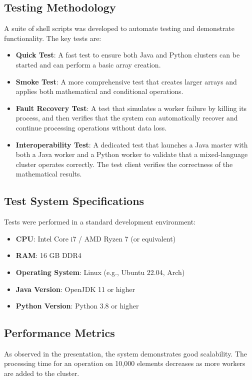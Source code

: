 \documentclass[10pt,a4paper]{article}
\theoremstyle{definition}
\theoremstyle{remark}
\begin{document}
\subsection{Testing Methodology}
A suite of shell scripts was developed to automate testing and demonstrate functionality. The key tests are:
\begin{itemize}
    \item \textbf{Quick Test}: A fast test to ensure both Java and Python clusters can be started and can perform a basic array creation.
    \item \textbf{Smoke Test}: A more comprehensive test that creates larger arrays and applies both mathematical and conditional operations.
    \item \textbf{Fault Recovery Test}: A test that simulates a worker failure by killing its process, and then verifies that the system can automatically recover and continue processing operations without data loss.
    \item \textbf{Interoperability Test}: A dedicated test that launches a Java master with both a Java worker and a Python worker to validate that a mixed-language cluster operates correctly. The test client verifies the correctness of the mathematical results.
\end{itemize}

\subsection{Test System Specifications}
Tests were performed in a standard development environment:
\begin{itemize}
    \item \textbf{CPU}: Intel Core i7 / AMD Ryzen 7 (or equivalent)
    \item \textbf{RAM}: 16 GB DDR4
    \item \textbf{Operating System}: Linux (e.g., Ubuntu 22.04, Arch)
    \item \textbf{Java Version}: OpenJDK 11 or higher
    \item \textbf{Python Version}: Python 3.8 or higher
\end{itemize}

\subsection{Performance Metrics}
As observed in the presentation, the system demonstrates good scalability. The processing time for an operation on 10,000 elements decreases as more workers are added to the cluster.
\end{document}

